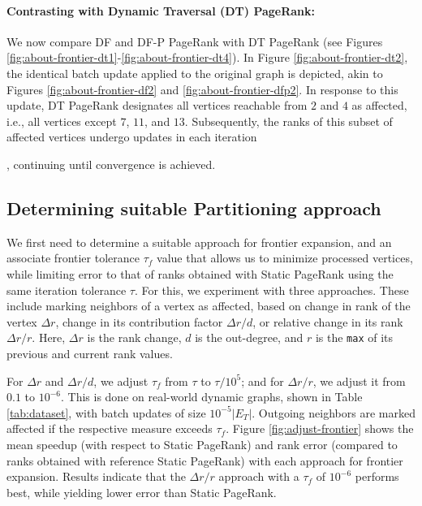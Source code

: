 \paragraph{Contrasting with Dynamic Traversal (DT) PageRank:}

We now compare DF and DF-P PageRank with DT PageRank (see Figures \ref{fig:about-frontier-dt1}-\ref{fig:about-frontier-dt4}). In Figure \ref{fig:about-frontier-dt2}, the identical batch update applied to the original graph is depicted, akin to Figures \ref{fig:about-frontier-df2} and \ref{fig:about-frontier-dfp2}. In response to this update, DT PageRank designates all vertices reachable from $2$ and $4$ as affected, i.e., all vertices except $7$, $11$, and $13$. Subsequently, the ranks of this subset of affected vertices undergo updates in each iteration, continuing until convergence is achieved.





\subsection{Determining suitable Partitioning approach}
\label{sec:parition-determine}

We first need to determine a suitable approach for frontier expansion, and an associate frontier tolerance $\tau_f$ value that allows us to minimize processed vertices, while limiting error to that of ranks obtained with Static PageRank using the same iteration tolerance $\tau$. For this, we experiment with three approaches. These include marking neighbors of a vertex as affected, based on change in rank of the vertex $\Delta r$, change in its contribution factor $\Delta r/d$, or relative change in its rank $\Delta r/r$. Here, $\Delta r$ is the rank change, $d$ is the out-degree, and $r$ is the \texttt{max} of its previous and current rank values.

For $\Delta r$ and $\Delta r/d$, we adjust $\tau_f$ from $\tau$ to $\tau/10^5$; and for $\Delta r/r$, we adjust it from $0.1$ to $10^{-6}$. This is done on real-world dynamic graphs, shown in Table \ref{tab:dataset}, with batch updates of size $10^{-5}|E_T|$. Outgoing neighbors are marked affected if the respective measure exceeds $\tau_f$. Figure \ref{fig:adjust-frontier} shows the mean speedup (with respect to Static PageRank) and rank error (compared to ranks obtained with reference Static PageRank) with each approach for frontier expansion. Results indicate that the $\Delta r/r$ approach with a $\tau_f$ of $10^{-6}$ performs best, while yielding lower error than Static PageRank.

